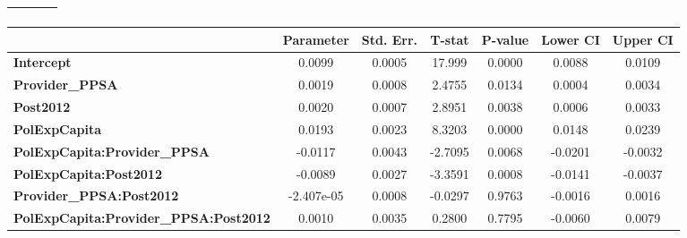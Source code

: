 \begin{center}
\begin{tabular}{lclc}
\textbf{}                                     &                    & \textbf{                     }   &                  \\
\bottomrule
\end{tabular}
\begin{tabular}{lcccccc}
                                              & \textbf{Parameter} & \textbf{Std. Err.} & \textbf{T-stat} & \textbf{P-value} & \textbf{Lower CI} & \textbf{Upper CI}  \\
\midrule
\textbf{Intercept}                            &       0.0099       &       0.0005       &      17.999     &      0.0000      &       0.0088      &       0.0109       \\
\textbf{Provider\_PPSA}                       &       0.0019       &       0.0008       &      2.4755     &      0.0134      &       0.0004      &       0.0034       \\
\textbf{Post2012}                             &       0.0020       &       0.0007       &      2.8951     &      0.0038      &       0.0006      &       0.0033       \\
\textbf{PolExpCapita}                         &       0.0193       &       0.0023       &      8.3203     &      0.0000      &       0.0148      &       0.0239       \\
\textbf{PolExpCapita:Provider\_PPSA}          &      -0.0117       &       0.0043       &     -2.7095     &      0.0068      &      -0.0201      &      -0.0032       \\
\textbf{PolExpCapita:Post2012}                &      -0.0089       &       0.0027       &     -3.3591     &      0.0008      &      -0.0141      &      -0.0037       \\
\textbf{Provider\_PPSA:Post2012}              &     -2.407e-05     &       0.0008       &     -0.0297     &      0.9763      &      -0.0016      &       0.0016       \\
\textbf{PolExpCapita:Provider\_PPSA:Post2012} &       0.0010       &       0.0035       &      0.2800     &      0.7795      &      -0.0060      &       0.0079       \\
\bottomrule
\end{tabular}
\end{center}